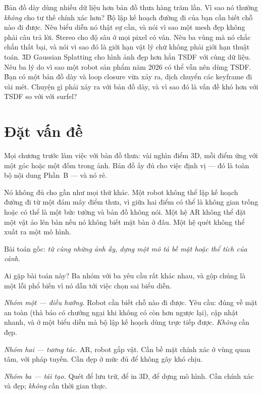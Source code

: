 \documentclass[../../vslam.tex]{subfiles}
\begin{document}
\begin{khoigoi}
\h{Bản đồ dày dùng nhiều dữ liệu hơn bản đồ thưa hàng trăm lần. Vì sao nó thường \emph{không} cho tư thế chính xác hơn?}
\h{Bộ lập kế hoạch đường đi của bạn cần biết chỗ nào đi được. Nêu biểu diễn nó thật sự cần, và nói vì sao một mesh đẹp không phải câu trả lời.}
\h{Stereo cho độ sâu ở mọi pixel có vân. Nêu ba vùng mà nó chắc chắn thất bại, và nói vì sao đó là giới hạn vật lý chứ không phải giới hạn thuật toán.}
\h{3D Gaussian Splatting cho hình ảnh đẹp hơn hẳn TSDF với cùng dữ liệu. Nêu ba lý do vì sao một robot sản phẩm năm 2026 có thể vẫn nên dùng TSDF.}
\h{Bạn có một bản đồ dày và loop closure vừa xảy ra, dịch chuyển các keyframe đi vài mét. Chuyện gì phải xảy ra với bản đồ dày, và vì sao đó là vấn đề khó hơn với TSDF so với với surfel?}
\end{khoigoi}

\section{Đặt vấn đề}

Mọi chương trước làm việc với bản đồ thưa: vài nghìn điểm \(3\)D, mỗi điểm ứng với một góc hoặc một đốm trong ảnh. Bản đồ ấy đủ cho việc định vị --- đó là toàn bộ nội dung Phần~B --- và nó rẻ.

Nó không đủ cho gần như mọi thứ khác. Một robot không thể lập kế hoạch đường đi từ một đám mây điểm thưa, vì giữa hai điểm có thể là không gian trống hoặc có thể là một bức tường và bản đồ không nói. Một hệ AR không thể đặt một vật ảo lên bàn nếu nó không biết mặt bàn ở đâu. Một hệ quét không thể xuất ra một mô hình.

Bài toán gốc: \emph{từ cùng những ảnh ấy, dựng một mô tả bề mặt hoặc thể tích của cảnh}.

Ai gặp bài toán này? Ba nhóm với ba yêu cầu rất khác nhau, và gộp chúng là một lỗi phổ biến vì nó dẫn tới việc chọn sai biểu diễn.

\emph{Nhóm một --- điều hướng.} Robot cần biết chỗ nào đi được. Yêu cầu: đúng về mặt an toàn (thà báo có chướng ngại khi không có còn hơn ngược lại), cập nhật nhanh, và ở một biểu diễn mà bộ lập kế hoạch dùng trực tiếp được. \emph{Không} cần đẹp.

\emph{Nhóm hai --- tương tác.} AR, robot gắp vật. Cần bề mặt chính xác ở vùng quan tâm, với pháp tuyến. Cần đẹp ở mức đủ để không gây khó chịu.

\emph{Nhóm ba --- tái tạo.} Quét để lưu trữ, để in \(3\)D, để dựng mô hình. Cần chính xác và đẹp; \emph{không} cần thời gian thực.
\end{document}
